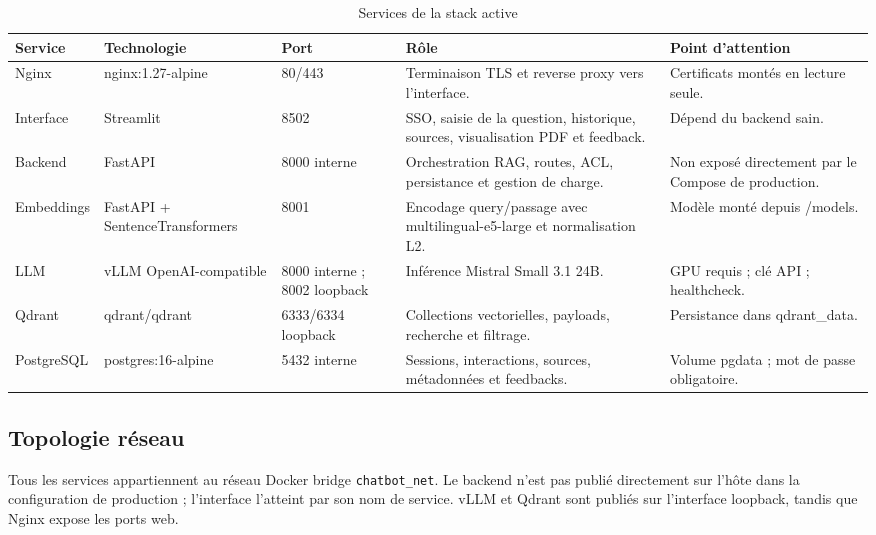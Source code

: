 \begin{table}[H]
\centering
\caption{Services de la stack active}
\label{tab:services_ch5}
\begin{tabular}{p{2.0cm}p{2.4cm}p{1.8cm}p{4.4cm}p{3.1cm}}
\toprule
\textbf{Service} & \textbf{Technologie} & \textbf{Port} & \textbf{Rôle} & \textbf{Point d'attention} \\
\midrule
Nginx & nginx:1.27-alpine & 80/443 & Terminaison TLS et reverse proxy vers l’interface. & Certificats montés en lecture seule. \\
Interface & Streamlit & 8502 & SSO, saisie de la question, historique, sources, visualisation PDF et feedback. & Dépend du backend sain. \\
Backend & FastAPI & 8000 interne & Orchestration RAG, routes, ACL, persistance et gestion de charge. & Non exposé directement par le Compose de production. \\
Embeddings & FastAPI + SentenceTransformers & 8001 & Encodage query/passage avec multilingual-e5-large et normalisation L2. & Modèle monté depuis /models. \\
LLM & vLLM OpenAI-compatible & 8000 interne ; 8002 loopback & Inférence Mistral Small 3.1 24B. & GPU requis ; clé API ; healthcheck. \\
Qdrant & qdrant/qdrant & 6333/6334 loopback & Collections vectorielles, payloads, recherche et filtrage. & Persistance dans qdrant\_data. \\
PostgreSQL & postgres:16-alpine & 5432 interne & Sessions, interactions, sources, métadonnées et feedbacks. & Volume pgdata ; mot de passe obligatoire. \\
\bottomrule
\end{tabular}
\end{table}

\subsection{Topologie réseau}

Tous les services appartiennent au réseau Docker bridge \texttt{chatbot\_net}. Le backend n'est pas publié directement sur l'hôte dans la configuration de production ; l'interface l'atteint par son nom de service. vLLM et Qdrant sont publiés sur l'interface loopback, tandis que Nginx expose les ports web.

